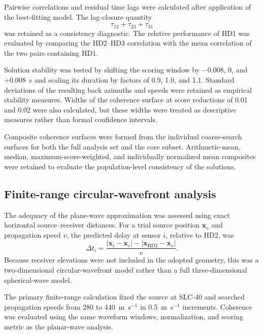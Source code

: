 \documentclass[]{seismica}
\begin{document}
Pairwise correlations and residual time lags were calculated after application of the best-fitting model. The lag-closure quantity
\begin{equation}
  \tau_{12}+\tau_{23}+\tau_{31}
  \label{eq:lag_closure}
\end{equation}
was retained as a consistency diagnostic. The relative performance of HD1 was evaluated by comparing the HD2--HD3 correlation with the mean correlation of the two pairs containing HD1.

Solution stability was tested by shifting the scoring window by $-0.008$, 0, and $+0.008$~s and scaling its duration by factors of 0.9, 1.0, and 1.1. Standard deviations of the resulting back azimuths and speeds were retained as empirical stability measures. Widths of the coherence surface at score reductions of 0.01 and 0.02 were also calculated, but these widths were treated as descriptive measures rather than formal confidence intervals.

Composite coherence surfaces were formed from the individual coarse-search surfaces for both the full analysis set and the core subset. Arithmetic-mean, median, maximum-score-weighted, and individually normalized mean composites were retained to evaluate the population-level consistency of the solutions.

\subsection{Finite-range circular-wavefront analysis}

The adequacy of the plane-wave approximation was assessed using exact horizontal source--receiver distances. For a trial source position $\mathbf{x}_s$ and propagation speed $v$, the predicted delay at sensor $i$, relative to HD2, was
\begin{equation}
  \Delta t_i = \frac{|\mathbf{x}_i-\mathbf{x}_s|-|\mathbf{x}_{\mathrm{HD2}}-\mathbf{x}_s|}{v}.
  \label{eq:circular_delay}
\end{equation}
Because receiver elevations were not included in the adopted geometry, this was a two-dimensional circular-wavefront model rather than a full three-dimensional spherical-wave model.

The primary finite-range calculation fixed the source at SLC-40 and searched propagation speeds from 280 to 440~m~s$^{-1}$ in 0.5~m~s$^{-1}$ increments. Coherence was evaluated using the same waveform windows, normalization, and scoring metric as the planar-wave analysis.
\end{document}
